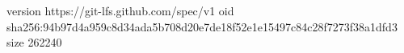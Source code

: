 version https://git-lfs.github.com/spec/v1
oid sha256:94b97d4a959c8d34ada5b708d20e7de18f52e1e15497c84c28f7273f38a1dfd3
size 262240
